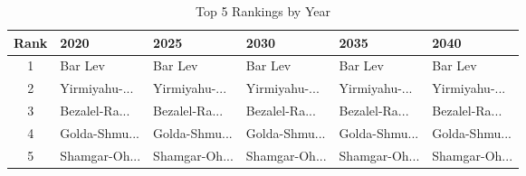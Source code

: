\begin{table}[H]
\centering
\caption{Top 5 Rankings by Year}
\label{tab:temporal}
\begin{tabular}{@{}clllll@{}}
\toprule
\textbf{Rank} & \textbf{2020} & \textbf{2025} & \textbf{2030} & \textbf{2035} & \textbf{2040} \\
\midrule
1 & Bar Lev & Bar Lev & Bar Lev & Bar Lev & Bar Lev \\
2 & Yirmiyahu-... & Yirmiyahu-... & Yirmiyahu-... & Yirmiyahu-... & Yirmiyahu-... \\
3 & Bezalel-Ra... & Bezalel-Ra... & Bezalel-Ra... & Bezalel-Ra... & Bezalel-Ra... \\
4 & Golda-Shmu... & Golda-Shmu... & Golda-Shmu... & Golda-Shmu... & Golda-Shmu... \\
5 & Shamgar-Oh... & Shamgar-Oh... & Shamgar-Oh... & Shamgar-Oh... & Shamgar-Oh... \\
\bottomrule
\end{tabular}
\end{table}


